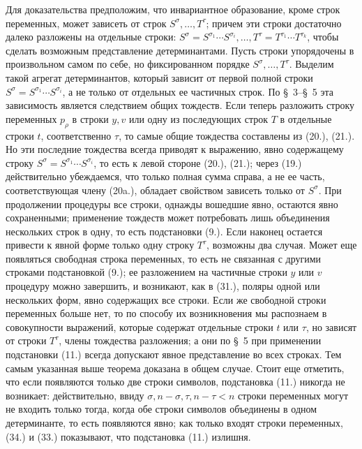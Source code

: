 \documentclass[11pt]{article}
\begin{document}
Для доказательства предположим, что инвариантное образование, кроме строк переменных, может зависеть от строк $S^\sigma,\ldots,T^\tau$; причем эти строки достаточно далеко разложены на отдельные строки:
$S^\sigma=S^{\sigma_1}\cdots S^{\sigma_i},\ldots,T^\tau=T^{\tau_1}\cdots T^{\tau_k}$, чтобы сделать возможным представление детерминантами. Пусть строки упорядочены в произвольном самом по себе, но фиксированном порядке $S^\sigma,\ldots,T^\tau$. Выделим такой агрегат детерминантов, который зависит от первой полной строки $S^\sigma=S^{\sigma_1}\cdots S^{\sigma_i}$, а не только от отдельных ее частичных строк. По \S\ 3--\S\ 5 эта зависимость является следствием общих тождеств. Если теперь разложить строку переменных $p_\rho$ в строки $y,v$ или одну из последующих строк $T$ в отдельные строки $t$, соответственно $\tau$, то самые общие тождества составлены из (20.), (21.). Но эти последние тождества всегда приводят к выражению, явно содержащему строку $S^\sigma=S^{\sigma_1}\cdots S^{\sigma_i}$, то есть к левой стороне (20.), (21.); через (19.) действительно убеждаемся, что только полная сумма справа, а не ее часть, соответствующая члену (20a.), обладает свойством зависеть только от $S^\sigma$. При продолжении процедуры все строки, однажды вошедшие явно, остаются явно сохраненными; применение тождеств может потребовать лишь объединения нескольких строк в одну, то есть подстановки (9.). Если наконец остается привести к явной форме только одну строку $T^\tau$, возможны два случая. Может еще появляться свободная строка переменных, то есть не связанная с другими строками подстановкой (9.); ее разложением на частичные строки $y$ или $v$ процедуру можно завершить, и возникают, как в (31.), поляры одной или нескольких форм, явно содержащих все строки. Если же свободной строки переменных больше нет, то по способу их возникновения мы распознаем в совокупности выражений, которые содержат отдельные строки $t$ или $\tau$, но зависят от строки $T^\tau$, члены тождества разложения; а они по \S\ 5 при применении подстановки (11.) всегда допускают явное представление во всех строках. Тем самым указанная выше теорема доказана в общем случае. Стоит еще отметить, что если появляются только две строки символов, подстановка (11.) никогда не возникает: действительно, ввиду $\sigma,n-\sigma,\tau,n-\tau<n$ строки переменных могут не входить только тогда, когда обе строки символов объединены в одном детерминанте, то есть появляются явно; как только входят строки переменных, (34.) и (33.) показывают, что подстановка (11.) излишня.
\end{document}
